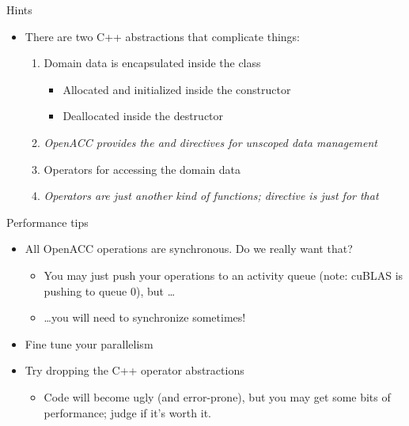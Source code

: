 \documentclass[12pt,aspectratio=169]{beamer}
\begin{document}
\begin{frame}{Hints}
  \begin{itemize}
  \item There are two C++ abstractions that complicate things:
    \vfill
    \begin{enumerate}
    \item Domain data is encapsulated inside the  class
      \begin{itemize}
      \item Allocated and initialized inside the constructor
      \item Deallocated inside the destructor
      \end{itemize}
    \item<2->[Hint:] \emph{OpenACC provides the  and
       directives for unscoped data management}
    \vfill
    \item<3-> Operators for accessing the domain data
    \item<4->[Hint:] \emph{Operators are just another kind of functions;
       directive is just for that}
    \end{enumerate}
  \end{itemize}
\end{frame}

\begin{frame}{Performance tips}
  \begin{itemize}
  \item All OpenACC operations are synchronous. Do we really want that?
    \begin{itemize}
    \item You may just push your operations to an activity queue (note: cuBLAS is
      pushing to queue 0), but \dots
    \item \dots you will need to synchronize sometimes!
    \end{itemize}
    \vfill
  \item Fine tune your parallelism
    \vfill
  \item Try dropping the C++ operator abstractions
    \begin{itemize}
    \item Code will become ugly (and error-prone), but you may get some bits of
      performance; judge if it's worth it.
    \end{itemize}
  \end{itemize}
\end{frame}
\end{document}
